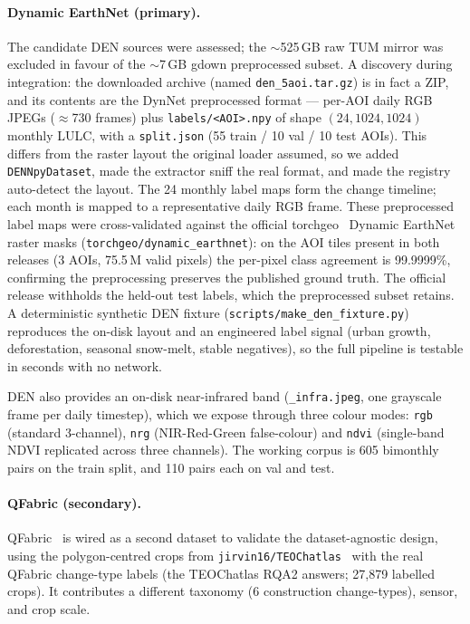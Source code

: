 \documentclass{article}
\begin{document}
\paragraph{Dynamic EarthNet (primary).}
The candidate DEN sources were assessed; the $\sim$525\,GB raw TUM mirror was
excluded in favour of the $\sim$7\,GB gdown preprocessed subset. A discovery
during integration: the downloaded archive (named \texttt{den\_5aoi.tar.gz}) is
in fact a ZIP, and its contents are the DynNet preprocessed
format --- per-AOI daily RGB JPEGs ($\approx$730 frames) plus
\texttt{labels/<AOI>.npy} of shape $(24, 1024, 1024)$ monthly LULC, with a
\texttt{split.json} (55 train / 10 val / 10 test AOIs). This differs from the
raster layout the original loader assumed, so we added \texttt{DENNpyDataset},
made the extractor sniff the real format, and made the registry auto-detect the
layout. The 24 monthly label maps form the change timeline; each month is mapped
to a representative daily RGB frame. These preprocessed label maps were
cross-validated against the official torchgeo~\cite{torchgeo} Dynamic EarthNet raster masks
(\texttt{torchgeo/dynamic\_earthnet}): on the AOI tiles present in both releases
(3 AOIs, 75.5\,M valid pixels) the per-pixel class agreement is 99.9999\%,
confirming the preprocessing preserves the published ground truth. The official
release withholds the held-out test labels, which the preprocessed subset
retains. A deterministic synthetic DEN fixture
(\texttt{scripts/make\_den\_fixture.py}) reproduces the on-disk layout and an
engineered label signal (urban growth, deforestation, seasonal snow-melt, stable
negatives), so the full pipeline is testable in seconds with no network.

DEN also provides an on-disk near-infrared band (\texttt{\_infra.jpeg}, one
grayscale frame per daily timestep), which we expose through three
colour modes: \texttt{rgb} (standard 3-channel), \texttt{nrg}
(NIR-Red-Green false-colour) and \texttt{ndvi} (single-band NDVI replicated
across three channels). The working corpus is 605 bimonthly pairs on the train
split, and 110 pairs each on val and test.

\paragraph{QFabric (secondary).}
QFabric~\cite{qfabric} is wired as a second dataset to validate the
dataset-agnostic design, using the polygon-centred crops from
\texttt{jirvin16/TEOChatlas}~\cite{teochat} with the
real QFabric change-type labels (the TEOChatlas RQA2 answers; 27{,}879
labelled crops). It contributes a different taxonomy (6 construction
change-types), sensor, and crop scale.
\end{document}
